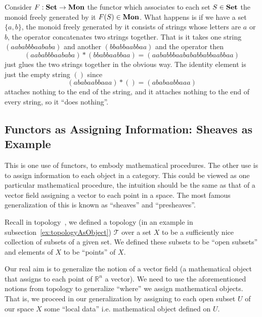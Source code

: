 \begin{ex}\label{ex:freeMonoidFunctor}
Consider $F:\mathbf{Set}\to\mathbf{Mon}$ the functor which associates to
each set $S\in\mathbf{Set}$ the monoid freely generated by it
$F(S)\in\mathbf{Mon}$. What happens is if we have a set $\{a,b\}$,
the monoid freely generated by it consists of strings whose
letters are $a$ or $b$, the operator concatenates two strings
together. That is it takes one string $(aababbbaababa)$ and another
$(bbabbaabbaa)$ and the operator then
\begin{equation}
(aababbbaababa)*(bbabbaabbaa)=(aababbbaabababbabbaabbaa)
\end{equation}
just glues the two strings together in the obvious way. The
identity element is just the empty string $()$ since
\begin{equation}
(ababaabbaaa)*() = (ababaabbaaa)
\end{equation}
attaches nothing to the end of the string, and it attaches
nothing to the end of every string, so it ``does nothing''.
\end{ex}

\subsection{Functors as Assigning Information: Sheaves as Example}

This is one use of functors, to embody mathematical
procedures. The other use is to assign information to each object
in a category. This could be viewed as one particular
mathematical procedure, the intuition should be the same as that
of a vector field assigning a vector to each point in a
space. The most famous generalization of this is known as
``sheaves'' and ``presheaves''.

Recall in topology~\cite{alexTopology}, we defined a topology (in
an example in subsection~\ref{ex:topologyAsObject}) $\mathcal{T}$
over a set $X$ to be a sufficiently nice collection of subsets of
a given set. We defined these subsets to be ``open subsets'' and
elements of $X$ to be ``points'' of $X$.

Our real aim is to generalize the notion of a vector field (a
mathematical object that assigns to each point of
$\mathbb{R}^{n}$ a vector). We need to use the aforementioned
notions from topology to generalize ``where'' we assign
mathematical objects. That is, we proceed in our generalization
by assigning to each open subset $U$ of our space $X$ some
``local data'' i.e. mathematical object defined on $U$.


